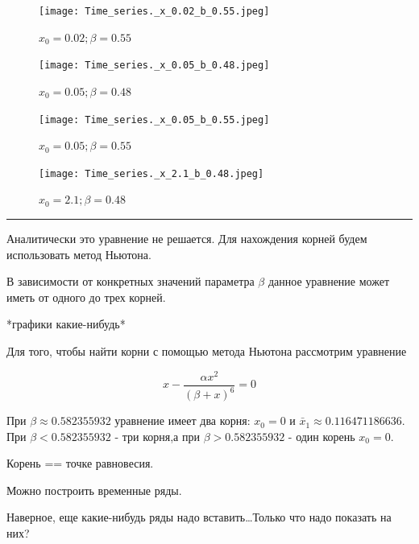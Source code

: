         \begin{figure}[h!]
            \centering
            \texttt{[image: Time\_series.\_x\_0.02\_b\_0.55.jpeg]}

            \captionsetup{justification=centering}
            \caption{\(x_0 = 0.02; \beta = 0.55\)}
            \label{timeSeriesX=0.02b=0.55}
        \end{figure}
    
        \begin{figure}[h!]
            \centering
            \texttt{[image: Time\_series.\_x\_0.05\_b\_0.48.jpeg]}

            \captionsetup{justification=centering}
            \caption{\(x_0 = 0.05; \beta = 0.48\)}
            \label{timeSeriesX=0.05b=0.48}
        \end{figure}
    
        \begin{figure}[h!]
            \centering
            \texttt{[image: Time\_series.\_x\_0.05\_b\_0.55.jpeg]}

            \captionsetup{justification=centering}
            \caption{\(x_0 = 0.05; \beta = 0.55\)}
            \label{timeSeriesX=0.05b=0.55}
        \end{figure}
    
        \begin{figure}[h!]
            \centering
            \texttt{[image: Time\_series.\_x\_2.1\_b\_0.48.jpeg]}

            \captionsetup{justification=centering}
            \caption{\(x_0 = 2.1; \beta = 0.48\)}
            \label{timeSeriesX=2.1b=0.48}
        \end{figure}

        \par\noindent\rule{\textwidth}{1pt}

        Аналитически это уравнение не решается. Для нахождения корней будем использовать метод Ньютона.

        В зависимости от конкретных значений параметра \(\beta\) данное уравнение может иметь от одного до трех корней.
    
        *графики какие-нибудь*

        Для того, чтобы найти корни с помощью метода Ньютона рассмотрим уравнение 
    
        \[x - \frac{\alpha x^2}{(\beta + x)^6} = 0\]

        При \(\beta \approx 0.582355932\) уравнение имеет два корня: \(x_0 = 0\) и \(\bar{x}_1 \approx 0.116471186636\). При \(\beta < 0.582355932\) - три корня,а при \(\beta > 0.582355932\) - один корень \(x_0 = 0\).
    
        Корень == точке равновесия.

        Можно построить временные ряды.

        Наверное, еще какие-нибудь ряды надо вставить\dots Только что надо показать на них?
